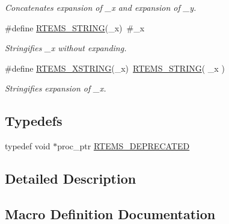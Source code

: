 \begin{DoxyCompactItemize}
\begin{DoxyCompactList}\small\item\em Concatenates expansion of \+\_\+x and expansion of \+\_\+y. \end{DoxyCompactList}\item 
\mbox{\label{group__RTEMSScoreBaseDefs_gae87a1a609641dbb2bf93196bbd82554b}} 
\#define \mbox{\hyperlink{group__RTEMSScoreBaseDefs_gae87a1a609641dbb2bf93196bbd82554b}{R\+T\+E\+M\+S\+\_\+\+S\+T\+R\+I\+NG}}(\+\_\+x)~\#\+\_\+x
\begin{DoxyCompactList}\small\item\em Stringifies \+\_\+x without expanding. \end{DoxyCompactList}\item 
\mbox{\label{group__RTEMSScoreBaseDefs_gae20dd87f41e0e16eae552a6bb857104d}} 
\#define \mbox{\hyperlink{group__RTEMSScoreBaseDefs_gae20dd87f41e0e16eae552a6bb857104d}{R\+T\+E\+M\+S\+\_\+\+X\+S\+T\+R\+I\+NG}}(\+\_\+x)~\mbox{\hyperlink{group__RTEMSScoreBaseDefs_gae87a1a609641dbb2bf93196bbd82554b}{R\+T\+E\+M\+S\+\_\+\+S\+T\+R\+I\+NG}}( \+\_\+x )
\begin{DoxyCompactList}\small\item\em Stringifies expansion of \+\_\+x. \end{DoxyCompactList}\end{DoxyCompactItemize}
\subsection*{Typedefs}
\begin{DoxyCompactItemize}
\item 
typedef void $\ast$proc\+\_\+ptr \mbox{\hyperlink{group__RTEMSScoreBaseDefs_gab651a076d4d51d50221e7ef7ac99d4e7}{R\+T\+E\+M\+S\+\_\+\+D\+E\+P\+R\+E\+C\+A\+T\+ED}}
\end{DoxyCompactItemize}


\subsection{Detailed Description}


\subsection{Macro Definition Documentation}
\mbox{\label{group__RTEMSScoreBaseDefs_ga637940aa2edf2a7dab2894ee8bc1a50d}} 
